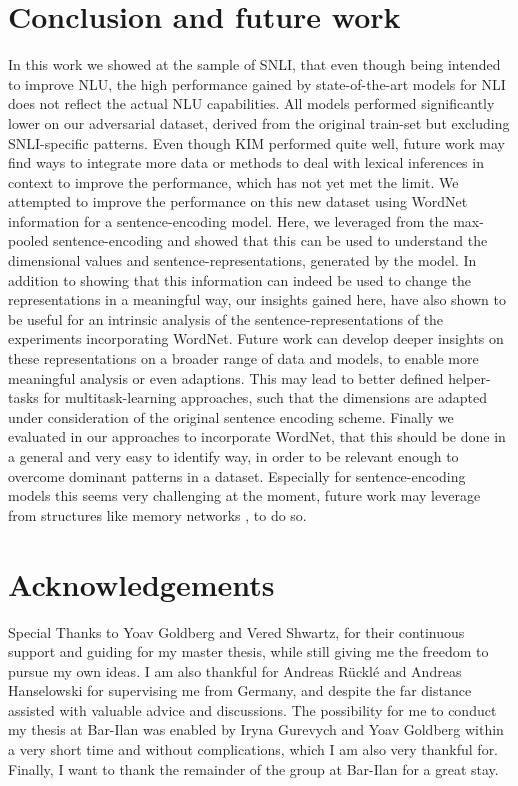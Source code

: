 \section{Conclusion and future work}
In this work we showed at the sample of \ac{SNLI}, that even though being intended to improve \ac{NLU}, the high performance gained by state-of-the-art models for \ac{NLI} does not reflect the actual \ac{NLU} capabilities. All models performed significantly lower on our adversarial dataset, derived from the original train-set but excluding \ac{SNLI}-specific patterns. Even though \ac{KIM} performed quite well, future work may find ways to integrate more data or methods to deal with lexical inferences in context to improve the performance, which has not yet met the limit. We attempted to improve the performance on this new dataset using WordNet information for a sentence-encoding model. Here, we leveraged from the max-pooled sentence-encoding and showed that this can be used to understand the dimensional values and sentence-representations, generated by the model. In addition to showing that this information can indeed be used to change the representations in a meaningful way, our insights gained here, have also shown to be useful for an intrinsic analysis of the sentence-representations of the experiments incorporating WordNet. Future work can develop deeper insights on these representations on a broader range of data and models, to enable more meaningful analysis or even adaptions. This may lead to better defined helper-tasks for multitask-learning approaches, such that the dimensions are adapted under consideration of the original sentence encoding scheme. Finally we evaluated in our approaches to incorporate WordNet, that this should be done in a general and very easy to identify way, in order to be relevant enough to overcome dominant patterns in a dataset. Especially for sentence-encoding models this seems very challenging at the moment, future work may leverage from structures like memory networks \citep{sukhbaatar2015end}, to do so.

\section*{Acknowledgements}
Special Thanks to Yoav Goldberg and Vered Shwartz, for their continuous support and guiding for my master thesis, while still giving me the freedom to pursue my own ideas. I am also thankful for Andreas Rücklé and Andreas Hanselowski for supervising me from Germany, and despite the far distance assisted with valuable advice and discussions. The possibility for me to conduct my thesis at Bar-Ilan was enabled by Iryna Gurevych and Yoav Goldberg within a very short time and without complications, which I am also very thankful for. Finally, I want to thank the remainder of the group at Bar-Ilan for a great stay.